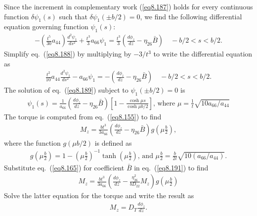 \documentclass{AeroStructure-ERJohnson}
\begin{document}
Since the increment in complementary work (\ref{eq8.187}) holds
for every continuous function $\delta \psi_{1}(s)$ such that
$\delta \psi_{1}(\pm b/ 2)=0$, we find the following differential
equation governing function $\psi_{1}(s)$:
\begin{align}\label{eq8.188}
-\left(\frac{t^{5}}{30} a_{44}\right) \frac{d^{2} \psi_{1}}{d
s^{2}}+\frac{t^{3}}{3} a_{66}
\psi_{1}=\frac{t^{3}}{3}\left(\frac{d \phi_{z}}{d z}-\eta_{26}
\bar{B}\right) \quad-b/ 2<s<b/ 2.
\end{align}
Simplify eq.~(\ref{eq8.188}) by multiplying by $-3/ t^{3}$ to
write the differential equation as
\begin{align}\label{eq8.189}
\frac{t^{2}}{10} a_{44} \frac{d^{2} \psi_{1}}{d s^{2}}-a_{66}
\psi_{1}=-\left(\frac{d \phi_{z}}{d z}-\eta_{26} \bar{B}\right)
\quad-b/ 2<s<b/ 2.
\end{align}
The solution of eq.~(\ref{eq8.189}) subject to $\psi_{1}(\pm b/
2)=0$\vspace*{-2pt} is
\begin{align}\label{eq8.190}
\psi_{1}(s)=\frac{1}{a_{66}}\left(\frac{d \phi_{z}}{d z}-\eta_{26}
\bar{B}\right)\left[1-\frac{\cosh \mu s}{\cosh \mu b/ 2}\right]\mbox{,
where }\mu=\frac{1}{t} \sqrt{10 a_{66}/ a_{44}}
\end{align}
The torque is computed from eq.~(\ref{eq8.155}) to\vspace*{-2pt} find
\begin{align}\label{eq8.191}
M_{z}=\frac{b t^{3}}{3 a_{66}}\left(\frac{d \phi_{z}}{d
z}-\eta_{26} \bar{B}\right) g\left(\mu \frac{b}{2}\right),
\end{align}
where the function $g(\mu b/ 2)$ is defined\vspace*{-2pt} as
\begin{align}\label{eq8.192}
g\left(\mu \frac{b}{2}\right)=1-\left(\mu \frac{b}{2}\right)^{-1}
\tanh \left(\mu \frac{b}{2}\right)\mbox{, and }\mu
\frac{b}{2}=\frac{b}{2 t} \sqrt{10\left(a_{66}/ a_{44}\right)}.
\end{align}
Substitute eq.~(\ref{eq8.165}) for coefficient $\bar{B}$ in
eq.~(\ref{eq8.191}) to\vspace*{-2pt} find
\begin{align*}
M_{z}=\frac{b t^{3}}{3 a_{66}}\left(\frac{d \phi_{z}}{d
z}-\frac{\eta_{26}^{2}}{b D_{22}} M_{z}\right) g\left(\mu
\frac{b}{2}\right)
\end{align*}
Solve the latter equation for the torque and write the result\vspace*{-2pt} as
\begin{align}\label{eq8.193}
M_{z}=D_{T} \frac{d \phi_{z}}{d z}.
\end{align}
\end{document}
